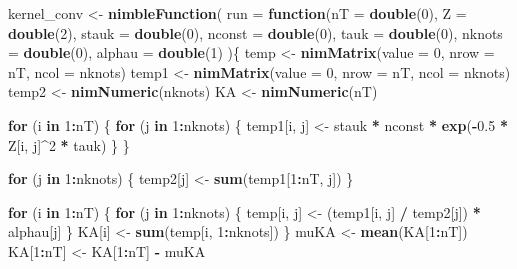 \documentclass[11pt,]{article}
\newenvironment{Shaded}{\begin{snugshade}}{\end{snugshade}}
\newcommand{\KeywordTok}[1]{\textcolor[rgb]{0.13,0.29,0.53}{\textbf{#1}}}
\newcommand{\DataTypeTok}[1]{\textcolor[rgb]{0.13,0.29,0.53}{#1}}
\newcommand{\DecValTok}[1]{\textcolor[rgb]{0.00,0.00,0.81}{#1}}
\newcommand{\FloatTok}[1]{\textcolor[rgb]{0.00,0.00,0.81}{#1}}
\newcommand{\StringTok}[1]{\textcolor[rgb]{0.31,0.60,0.02}{#1}}
\newcommand{\ControlFlowTok}[1]{\textcolor[rgb]{0.13,0.29,0.53}{\textbf{#1}}}
\newcommand{\OperatorTok}[1]{\textcolor[rgb]{0.81,0.36,0.00}{\textbf{#1}}}
\newcommand{\NormalTok}[1]{#1}
\begin{document}
\begin{Shaded}
\begin{Highlighting}[]
\NormalTok{kernel_conv <-}\StringTok{ }\KeywordTok{nimbleFunction}\NormalTok{(}
  \DataTypeTok{run =} \ControlFlowTok{function}\NormalTok{(}\DataTypeTok{nT =} \KeywordTok{double}\NormalTok{(}\DecValTok{0}\NormalTok{),}
                 \DataTypeTok{Z =} \KeywordTok{double}\NormalTok{(}\DecValTok{2}\NormalTok{),}
                 \DataTypeTok{stauk =} \KeywordTok{double}\NormalTok{(}\DecValTok{0}\NormalTok{),}
                 \DataTypeTok{nconst =} \KeywordTok{double}\NormalTok{(}\DecValTok{0}\NormalTok{),}
                 \DataTypeTok{tauk =} \KeywordTok{double}\NormalTok{(}\DecValTok{0}\NormalTok{),}
                 \DataTypeTok{nknots =} \KeywordTok{double}\NormalTok{(}\DecValTok{0}\NormalTok{),}
                 \DataTypeTok{alphau =} \KeywordTok{double}\NormalTok{(}\DecValTok{1}\NormalTok{)}
\NormalTok{  )\{}
\NormalTok{    temp <-}\StringTok{ }\KeywordTok{nimMatrix}\NormalTok{(}\DataTypeTok{value =} \DecValTok{0}\NormalTok{, }\DataTypeTok{nrow =}\NormalTok{ nT, }\DataTypeTok{ncol =}\NormalTok{ nknots)}
\NormalTok{    temp1 <-}\StringTok{ }\KeywordTok{nimMatrix}\NormalTok{(}\DataTypeTok{value =} \DecValTok{0}\NormalTok{, }\DataTypeTok{nrow =}\NormalTok{ nT, }\DataTypeTok{ncol =}\NormalTok{ nknots)}
\NormalTok{    temp2 <-}\StringTok{ }\KeywordTok{nimNumeric}\NormalTok{(nknots)}
\NormalTok{    KA <-}\StringTok{ }\KeywordTok{nimNumeric}\NormalTok{(nT)}

    \ControlFlowTok{for}\NormalTok{ (i }\ControlFlowTok{in} \DecValTok{1}\OperatorTok{:}\NormalTok{nT) \{}
      \ControlFlowTok{for}\NormalTok{ (j }\ControlFlowTok{in} \DecValTok{1}\OperatorTok{:}\NormalTok{nknots) \{}
\NormalTok{        temp1[i, j] <-}\StringTok{ }\NormalTok{stauk }\OperatorTok{*}\StringTok{ }\NormalTok{nconst }\OperatorTok{*}\StringTok{ }\KeywordTok{exp}\NormalTok{(}\OperatorTok{-}\FloatTok{0.5} \OperatorTok{*}\StringTok{ }\NormalTok{Z[i, j]}\OperatorTok{^}\DecValTok{2} \OperatorTok{*}\StringTok{ }\NormalTok{tauk)}
\NormalTok{      \}}
\NormalTok{    \}}

    \ControlFlowTok{for}\NormalTok{ (j }\ControlFlowTok{in} \DecValTok{1}\OperatorTok{:}\NormalTok{nknots) \{}
\NormalTok{      temp2[j] <-}\StringTok{ }\KeywordTok{sum}\NormalTok{(temp1[}\DecValTok{1}\OperatorTok{:}\NormalTok{nT, j])}
\NormalTok{    \}}

    \ControlFlowTok{for}\NormalTok{ (i }\ControlFlowTok{in} \DecValTok{1}\OperatorTok{:}\NormalTok{nT) \{}
      \ControlFlowTok{for}\NormalTok{ (j }\ControlFlowTok{in} \DecValTok{1}\OperatorTok{:}\NormalTok{nknots) \{}
\NormalTok{        temp[i, j] <-}\StringTok{ }\NormalTok{(temp1[i, j] }\OperatorTok{/}\StringTok{ }\NormalTok{temp2[j]) }\OperatorTok{*}\StringTok{ }\NormalTok{alphau[j]}
\NormalTok{      \}}
\NormalTok{      KA[i] <-}\StringTok{ }\KeywordTok{sum}\NormalTok{(temp[i, }\DecValTok{1}\OperatorTok{:}\NormalTok{nknots])}
\NormalTok{    \}}
\NormalTok{    muKA <-}\StringTok{ }\KeywordTok{mean}\NormalTok{(KA[}\DecValTok{1}\OperatorTok{:}\NormalTok{nT])}
\NormalTok{    KA[}\DecValTok{1}\OperatorTok{:}\NormalTok{nT] <-}\StringTok{ }\NormalTok{KA[}\DecValTok{1}\OperatorTok{:}\NormalTok{nT] }\OperatorTok{-}\StringTok{ }\NormalTok{muKA}


\end{Highlighting}
\end{Shaded}
\end{document}
